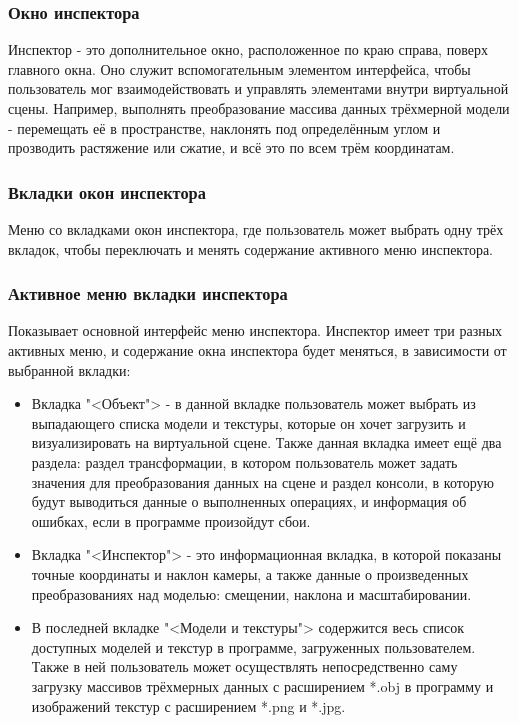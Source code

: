 \subsubsection{Окно инспектора}

Инспектор - это дополнительное окно, расположенное по краю справа, поверх главного окна. Оно служит вспомогательным элементом интерфейса, чтобы пользователь мог взаимодействовать и управлять элементами внутри виртуальной сцены. Например, выполнять преобразование массива данных трёхмерной модели - перемещать её в пространстве, наклонять под определённым углом и прозводить растяжение или сжатие, и всё это по всем трём координатам.

\subsubsection{Вкладки окон инспектора}

Меню со вкладками окон инспектора, где пользователь может выбрать одну трёх вкладок, чтобы переключать и менять содержание активного меню инспектора.

\subsubsection{Активное меню вкладки инспектора}

Показывает основной интерфейс меню инспектора. Инспектор имеет три разных активных меню, и содержание окна инспектора будет меняться, в зависимости от выбранной вкладки:
\begin{itemize}
	\item Вкладка "<Объект"> - в данной вкладке пользователь может выбрать из выпадающего списка модели и текстуры, которые он хочет загрузить и визуализировать на виртуальной сцене. Также данная вкладка имеет ещё два раздела: раздел трансформации, в котором пользователь может задать значения для преобразования данных на сцене и раздел консоли, в которую будут выводиться данные о выполненных операциях, и информация об ошибках, если в программе произойдут сбои.
	\item Вкладка "<Инспектор"> - это информационная вкладка, в которой показаны точные координаты и наклон камеры, а также данные о произведенных преобразованиях над моделью: смещении, наклона и масштабировании.
	\item  В последней вкладке "<Модели и текстуры"> содержится весь список доступных моделей и текстур в программе, загруженных пользователем. Также в ней пользователь может осуществлять непосредственно саму загрузку массивов трёхмерных данных с расширением *.obj в программу и изображений текстур с расширением *.png и *.jpg.
\end{itemize}